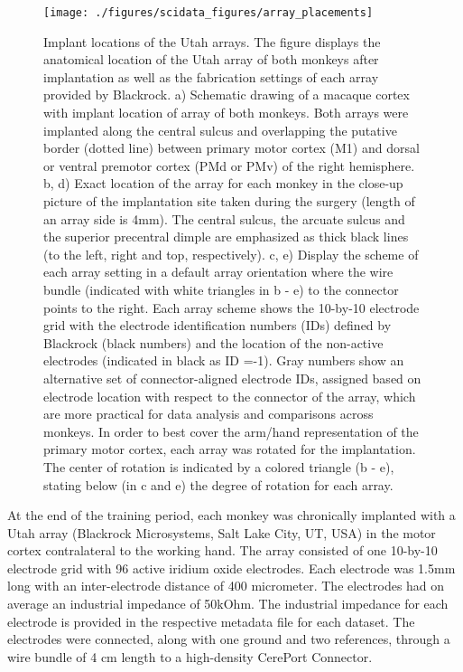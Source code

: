 {\begin{figure}
\texttt{[image: ./figures/scidata\_figures/array\_placements]}
\caption[Implant locations of the Utah arrays]{Implant locations of the Utah arrays. The figure displays the anatomical location of the Utah array of both monkeys after implantation as well as the fabrication settings of each array provided by Blackrock. a) Schematic drawing of a macaque cortex with implant location of array of both monkeys. Both arrays were implanted along the central sulcus and overlapping the putative border (dotted line) between primary motor cortex (M1) and dorsal or ventral premotor cortex (PMd or PMv) of the right hemisphere. b, d) Exact location of the array for each monkey in the close-up picture of the implantation site taken during the surgery (length of an array side is 4mm). The central sulcus, the arcuate sulcus and the superior precentral dimple are emphasized as thick black lines (to the left, right and top, respectively). c, e) Display the scheme of each array setting in a default array orientation where the wire bundle (indicated with white triangles in b - e) to the connector points to the right. Each array scheme shows the 10-by-10 electrode grid with the electrode identification numbers (IDs) defined by Blackrock (black numbers) and the location of the non-active electrodes (indicated in black as ID =-1). Gray numbers show an alternative set of connector-aligned electrode IDs, assigned based on electrode location with respect to the connector of the array, which are more practical for data analysis and comparisons across monkeys. In order to best cover the arm/hand representation of the primary motor cortex, each array was rotated for the implantation. The center of rotation is indicated by a colored triangle (b - e), stating below (in c and e) the degree of rotation for each array.}
\end{figure}


At the end of the training period, each monkey was chronically implanted with a Utah array (Blackrock Microsystems, Salt Lake City, UT, USA) in the motor cortex contralateral to the working hand. The array consisted of one 10-by-10 electrode grid with 96 active iridium oxide electrodes. Each electrode was 1.5mm long with an inter-electrode distance of 400 micrometer. The electrodes had on average an industrial impedance of 50kOhm. The industrial impedance for each electrode is provided in the respective metadata file for each dataset. The electrodes were connected, along with one ground and two references, through a wire bundle of 4 cm length to a high-density CerePort Connector. 

}
